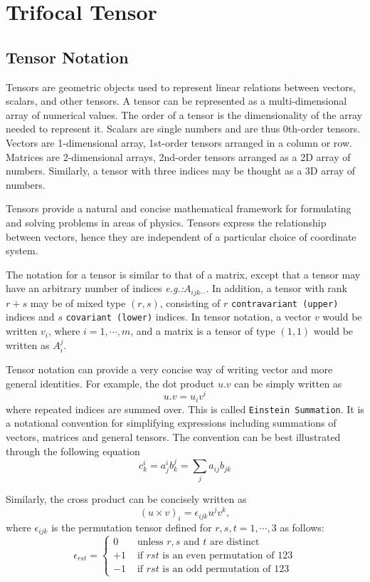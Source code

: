 \section{Trifocal Tensor}
\subsection{Tensor Notation}
Tensors are geometric objects used to represent linear relations between vectors, scalars, and other tensors. A tensor can be represented as a multi-dimensional array of numerical values. The order of a tensor is the dimensionality of the array needed to represent it. Scalars are single numbers and are thus 0th-order tensors. Vectors are 1-dimensional array, 1st-order tensors arranged in a column or row. Matrices are 2-dimensional arrays, 2nd-order tensors arranged as a 2D array of numbers. Similarly, a tensor with three indices may be thought as a 3D array of numbers.

Tensors provide a natural and concise mathematical framework for formulating and solving problems in areas of physics. Tensors express the relationship between vectors, hence they are independent of a particular choice of coordinate system.

The notation for a tensor is similar to that of a matrix, except that a tensor may have an arbitrary number of indices \textit{e.g.:}$A_{ijk\dotsb}$. In addition, a tensor with rank $r+s$ may be of mixed type $(r,s)$, consisting of $r$ \texttt{contravariant (upper)} indices and $s$ \texttt{covariant (lower)} indices. In tensor notation, a vector $v$ would be written $v_i$, where $i =1,\dotsb,m$, and a matrix is a tensor of type $(1,1)$ would be written as $A^{j}_{i}$.

Tensor notation can provide a very concise way of writing vector and more general identities. For example, the dot product $u.v$ can be simply written as
$$
u.v = u_{i}v^{i}
$$
where repeated indices are summed over. This is called \texttt{Einstein Summation}. It is a notational convention for simplifying expressions including summations of vectors, matrices and general tensors. The convention can be best illustrated through the following equation
$$
  c^{i}_{k} = a^{i}_{j}b^{j}_{k} = \sum_{j} a_{ij}b_{jk}
$$

Similarly, the cross product can be concisely written as
$$
  (u\times v)_{i} = \epsilon_{ijk} u^{j} v^{k},
$$
where $\epsilon_{ijk}$ is the permutation tensor defined for $r,s,t =1,\dotsb,3$ as follows:
$$
\epsilon_{rst} = \begin{cases}
  0 & \text{ unless } r,s \text{ and } t \text{ are distinct}\\
  +1 & \text{ if } rst \text{ is an even permutation of } 123\\
  -1 & \text{ if } rst \text{ is an odd permutation of } 123
\end{cases}
$$

